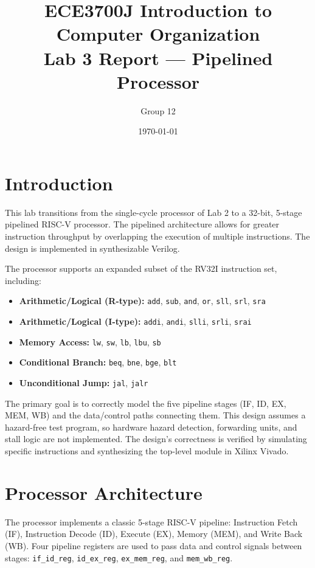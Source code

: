 \documentclass{article}
\title{\textbf{ECE3700J Introduction to Computer Organization \\
Lab 3 Report --- Pipelined Processor}}
\author{\large Group 12 \\ %
}
\date{\today} %
\begin{document}
\maketitle

\newpage
\tableofcontents

\newpage
\section{Introduction}

This lab transitions from the single-cycle processor of Lab 2 to a 32-bit, 5-stage pipelined RISC-V processor. The pipelined architecture allows for greater instruction throughput by overlapping the execution of multiple instructions. The design is implemented in synthesizable Verilog.

The processor supports an expanded subset of the RV32I instruction set, including:
\begin{itemize}
    \item \textbf{Arithmetic/Logical (R-type):} \texttt{add}, \texttt{sub}, \texttt{and}, \texttt{or}, \texttt{sll}, \texttt{srl}, \texttt{sra}
    \item \textbf{Arithmetic/Logical (I-type):} \texttt{addi}, \texttt{andi}, \texttt{slli}, \texttt{srli}, \texttt{srai}
    \item \textbf{Memory Access:} \texttt{lw}, \texttt{sw}, \texttt{lb}, \texttt{lbu}, \texttt{sb}
    \item \textbf{Conditional Branch:} \texttt{beq}, \texttt{bne}, \texttt{bge}, \texttt{blt}
    \item \textbf{Unconditional Jump:} \texttt{jal}, \texttt{jalr}
\end{itemize}

The primary goal is to correctly model the five pipeline stages (IF, ID, EX, MEM, WB) and the data/control paths connecting them. This design assumes a hazard-free test program, so hardware hazard detection, forwarding units, and stall logic are not implemented. The design's correctness is verified by simulating specific instructions and synthesizing the top-level module in Xilinx Vivado.

\section{Processor Architecture}

The processor implements a classic 5-stage RISC-V pipeline: Instruction Fetch (IF), Instruction Decode (ID), Execute (EX), Memory (MEM), and Write Back (WB). Four pipeline registers are used to pass data and control signals between stages: \texttt{if\_id\_reg}, \texttt{id\_ex\_reg}, \texttt{ex\_mem\_reg}, and \texttt{mem\_wb\_reg}.
\end{document}
